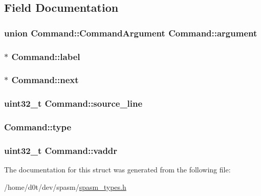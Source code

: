 \subsection{\-Field \-Documentation}
\hypertarget{struct_command_aaccdf5b1e595a63e70012506fd31122c}{
\subsubsection[{argument}]{\setlength{\rightskip}{0pt plus 5cm}union {\bf \-Command\-::\-Command\-Argument}  {\bf \-Command\-::argument}}}\label{struct_command_aaccdf5b1e595a63e70012506fd31122c}
\hypertarget{struct_command_a928d3057e62c334c92ecc9aa9d90980b}{
\subsubsection[{label}]{$\ast$ {\bf \-Command\-::label}}}\label{struct_command_a928d3057e62c334c92ecc9aa9d90980b}
\hypertarget{struct_command_af9c9ea6f57adad15eb7af71d6834d0b4}{
\subsubsection[{next}]{$\ast$ {\bf \-Command\-::next}}}\label{struct_command_af9c9ea6f57adad15eb7af71d6834d0b4}
\hypertarget{struct_command_a3e96525aafdcdfeb775c30f5f334efce}{
\subsubsection[{source\-\_\-line}]{\setlength{\rightskip}{0pt plus 5cm}uint32\-\_\-t {\bf \-Command\-::source\-\_\-line}}}\label{struct_command_a3e96525aafdcdfeb775c30f5f334efce}
\hypertarget{struct_command_afd23b7e189739dbae6c0f2e93ba02c81}{
\subsubsection[{type}]{ {\bf \-Command\-::type}}}\label{struct_command_afd23b7e189739dbae6c0f2e93ba02c81}
\hypertarget{struct_command_aa969b498ef234bfdfcc3b98da28e12a3}{
\subsubsection[{vaddr}]{\setlength{\rightskip}{0pt plus 5cm}uint32\-\_\-t {\bf \-Command\-::vaddr}}}\label{struct_command_aa969b498ef234bfdfcc3b98da28e12a3}


\-The documentation for this struct was generated from the following file\-:\begin{DoxyCompactItemize}
\item 
/home/d0t/dev/spasm/\hyperlink{spasm__types_8h}{spasm\-\_\-types.\-h}\end{DoxyCompactItemize}
